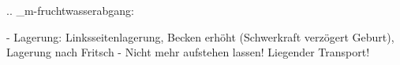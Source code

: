 
.. _m-fruchtwasserabgang:


\begin{itemize}
    -   Lagerung: Linksseitenlagerung, Becken erhöht
    (Schwerkraft verzögert Geburt), Lagerung nach Fritsch
    -   Nicht mehr aufstehen lassen! Liegender Transport!
\end{itemize}